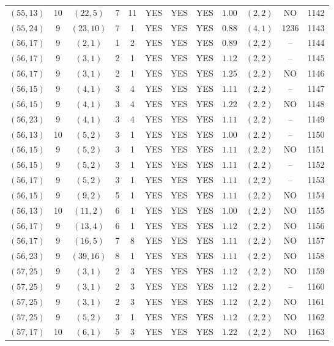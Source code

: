 \begin{longtable}{|c|c|c|c|c|c|c|c|c|c|c|c|}
$(55,13)$ & 10 & $(22,5)$ & 7 & 11 & YES & YES & YES & $1.00$ & $(2,2)$ & NO & 1142\\
$(55,24)$ & 9 & $(23,10)$ & 7 & 1 & YES & YES & YES & $0.88$ & $(4,1)$ & 1236 & 1143\\
$(56,17)$ & 9 & $(2,1)$ & 1 & 2 & YES & YES & YES & $0.89$ & $(2,2)$ & -- & 1144\\
$(56,17)$ & 9 & $(3,1)$ & 2 & 1 & YES & YES & YES & $1.12$ & $(2,2)$ & -- & 1145\\
$(56,17)$ & 9 & $(3,1)$ & 2 & 1 & YES & YES & YES & $1.25$ & $(2,2)$ & NO & 1146\\
$(56,15)$ & 9 & $(4,1)$ & 3 & 4 & YES & YES & YES & $1.11$ & $(2,2)$ & -- & 1147\\
$(56,15)$ & 9 & $(4,1)$ & 3 & 4 & YES & YES & YES & $1.22$ & $(2,2)$ & NO & 1148\\
$(56,23)$ & 9 & $(4,1)$ & 3 & 4 & YES & YES & YES & $1.11$ & $(2,2)$ & -- & 1149\\
$(56,13)$ & 10 & $(5,2)$ & 3 & 1 & YES & YES & YES & $1.00$ & $(2,2)$ & -- & 1150\\
$(56,15)$ & 9 & $(5,2)$ & 3 & 1 & YES & YES & YES & $1.11$ & $(2,2)$ & NO & 1151\\
$(56,15)$ & 9 & $(5,2)$ & 3 & 1 & YES & YES & YES & $1.11$ & $(2,2)$ & -- & 1152\\
$(56,17)$ & 9 & $(5,2)$ & 3 & 1 & YES & YES & YES & $1.11$ & $(2,2)$ & -- & 1153\\
$(56,15)$ & 9 & $(9,2)$ & 5 & 1 & YES & YES & YES & $1.11$ & $(2,2)$ & NO & 1154\\
$(56,13)$ & 10 & $(11,2)$ & 6 & 1 & YES & YES & YES & $1.00$ & $(2,2)$ & NO & 1155\\
$(56,17)$ & 9 & $(13,4)$ & 6 & 1 & YES & YES & YES & $1.12$ & $(2,2)$ & NO & 1156\\
$(56,17)$ & 9 & $(16,5)$ & 7 & 8 & YES & YES & YES & $1.11$ & $(2,2)$ & NO & 1157\\
$(56,23)$ & 9 & $(39,16)$ & 8 & 1 & YES & YES & YES & $1.11$ & $(2,2)$ & NO & 1158\\
$(57,25)$ & 9 & $(3,1)$ & 2 & 3 & YES & YES & YES & $1.12$ & $(2,2)$ & NO & 1159\\
$(57,25)$ & 9 & $(3,1)$ & 2 & 3 & YES & YES & YES & $1.12$ & $(2,2)$ & -- & 1160\\
$(57,25)$ & 9 & $(3,1)$ & 2 & 3 & YES & YES & YES & $1.12$ & $(2,2)$ & NO & 1161\\
$(57,25)$ & 9 & $(5,2)$ & 3 & 1 & YES & YES & YES & $1.12$ & $(2,2)$ & NO & 1162\\
$(57,17)$ & 10 & $(6,1)$ & 5 & 3 & YES & YES & YES & $1.22$ & $(2,2)$ & NO & 1163\\

\end{longtable}
